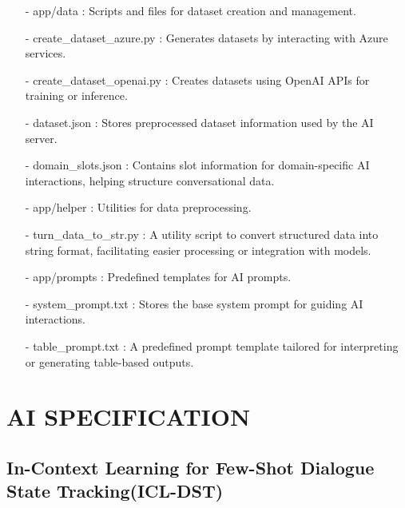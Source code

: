 \documentclass[conference]{IEEEtran}
\begin{document}
\begin{enumerate}
\begin{itemize}
\begin{itemize}
\begin{enumerate}
\begin{enumerate}
        \item[-] app/data : Scripts and files for dataset creation and management.\\
        \item[-] create\_dataset\_azure.py : Generates datasets by interacting with Azure services.\\
        \item[-] create\_dataset\_openai.py : Creates datasets using OpenAI APIs for training or inference.\\
        \item[-] dataset.json : Stores preprocessed dataset information used by the AI server.\\
        \item[-] domain\_slots.json : Contains slot information for domain-specific AI interactions, helping structure conversational data.\\
        
        \item[-] app/helper : Utilities for data preprocessing.\\
        \item[-] turn\_data\_to\_str.py : A utility script to convert structured data into string format, facilitating easier processing or integration with models.\\
        
        \item[-] app/prompts : Predefined templates for AI prompts.\\
        \item[-] system\_prompt.txt : Stores the base system prompt for guiding AI interactions.\\
        \item[-] table\_prompt.txt : A predefined prompt template tailored for interpreting or generating table-based outputs.\\
\end{enumerate}


\section{AI SPECIFICATION}

\subsection{In-Context Learning for Few-Shot Dialogue State Tracking(ICL-DST)}


\end{enumerate}
\end{itemize}
\end{itemize}
\end{enumerate}
\end{document}
